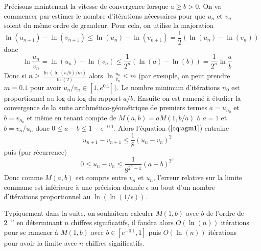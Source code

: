\documentclass[a4paper,11pt]{book}
\begin{document}
\begin{giacjshere}
Précisons maintenant la vitesse de convergence lorsque $a \geq b>0$. 
On va commencer par estimer le nombre
d'itérations nécessaires pour que $u_n$ et $v_n$ soient du même ordre de grandeur.
Pour cela, on utilise la majoration
\[ \ln(u_{n+1})-\ln(v_{n+1}) \leq \ln(u_{n})-\ln(v_{n+1}) = \frac{1}{2}
(\ln(u_{n})-\ln(v_{n})) \]
donc
\[ \ln \frac{u_n}{v_n} = \ln(u_n)-\ln(v_n) \leq 
\frac{1}{2^n} (\ln(a)-\ln(b)) = \frac{1}{2^n} \ln \frac{a}{b} \]
Donc si $n \geq \frac{\ln( \ln(a/b)/m)}{\ln(2)}$ alors
$\ln \frac{u_n}{v_n} \leq m$ (par exemple, on peut prendre $m=0.1$ pour 
avoir $u_n/v_n \in [1,e^{0.1}])$. Le nombre minimum d'itérations $n_0$ est proportionnel
au log du log du rapport $a/b$.
Ensuite on est ramené à étudier la convergence de la suite arithmético-géométrique
de premiers termes $a=u_{n_0}$ et $b=v_{n_0}$ et même en tenant compte
de $M(a,b)=aM(1,b/a)$ à $a=1$ et $b=v_n/u_n$ donc $0\leq a-b \leq 1-e^{-0.1}$.
Alors l'équation (\(\ref{eq:agm1}\)) entraine 
\[ u_{n+1}-v_{n+1} \leq \frac{1}{8}(u_n-v_n)^2 \]
puis (par récurrence)
\[ 0 \leq u_n-v_n \leq \frac{1}{8^{2^n-1}}(a-b)^{2^n} \]
Donc comme $M(a,b)$ est compris entre $v_n$ et $u_n$, l'erreur relative sur la limite
commune est inférieure à une précision donnée $\epsilon$
au bout d'un nombre d'itérations proportionnel au $\ln(\ln(1/\epsilon))$.

Typiquement dans la suite, on souhaitera calculer $M(1,b)$ avec $b$ de l'ordre
de $2^{-n}$ en déterminant $n$ chiffres significatifs,
il faudra alors $O(\ln(n))$ itérations pour se ramener à $M(1,b)$ avec $b\in [e^{-0.1},1]$ 
puis $O(\ln(n))$ itérations pour avoir la limite avec $n$ chiffres significatifs.


\end{giacjshere}
\end{document}
